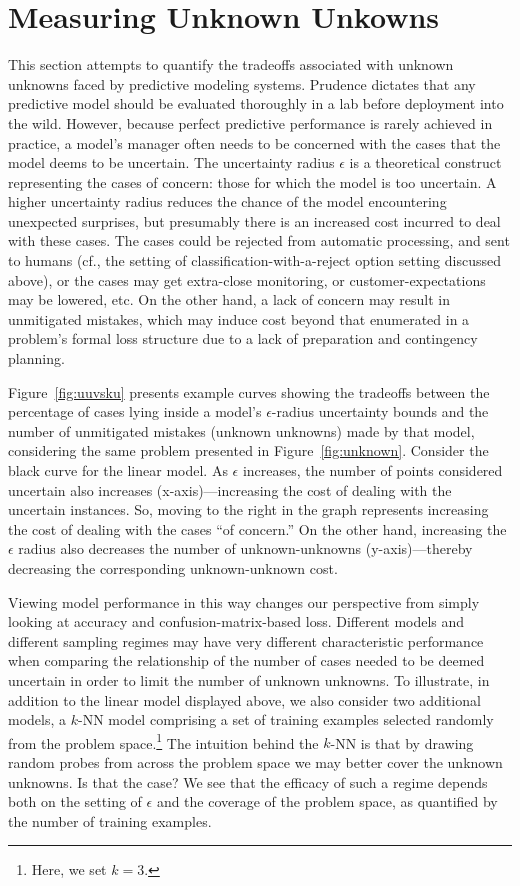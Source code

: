 \section{Measuring Unknown Unkowns}
\label{sec:measure}

This section attempts to quantify the tradeoffs associated with
unknown unknowns faced by predictive modeling systems.  Prudence dictates that any
predictive model should be evaluated thoroughly in a lab before
deployment into the wild. However, because perfect predictive
performance is rarely achieved in practice, a model's manager often
needs to be concerned with the cases that the model deems to be
uncertain.  The uncertainty radius $\epsilon$ is a theoretical
construct representing the cases of concern: those for which the model
is too uncertain.  A higher uncertainty radius reduces the chance of the model encountering unexpected surprises, but
 presumably there is an increased cost incurred to deal with these cases.
The cases could be rejected from automatic processing, and sent to
humans (cf., the setting of classification-with-a-reject option setting discussed above), or the
cases may get extra-close monitoring, or customer-expectations may be
lowered, etc.  On the other hand, a lack of concern may result in
unmitigated mistakes, which may induce cost beyond that enumerated in
a problem's formal loss structure due to a lack of preparation and contingency
planning.

Figure~\ref{fig:uuvsku} presents example curves showing the tradeoffs
between the percentage of cases lying inside a model's
$\epsilon$-radius uncertainty bounds and the number of unmitigated
mistakes (unknown unknowns) made by that model, considering the same
problem presented in Figure~\ref{fig:unknown}.  Consider the black
curve for the linear model.  As $\epsilon$ increases, the number of
points considered uncertain also increases (x-axis)---increasing the
cost of dealing with the uncertain instances.  So, moving to the right
in the graph represents increasing the cost of dealing with the cases
``of concern.''  On the other hand, increasing the $\epsilon$ radius
also decreases the number of unknown-unknowns (y-axis)---thereby
decreasing the corresponding unknown-unknown cost.

Viewing model performance in this way changes our perspective from
simply looking at accuracy and confusion-matrix-based loss.  Different
models and different sampling regimes may have very different
characteristic performance when comparing the relationship of the
number of cases needed to be deemed uncertain in order to limit the
number of unknown unknowns.
To illustrate, in addition to
the linear model displayed above, we also consider two additional
models, a $k$-NN model comprising a set of training examples selected randomly
from the problem space.\footnote{Here, we set $k=3$.} The intuition behind the $k$-NN is that by drawing
random probes from across the problem space we may better cover the unknown unknowns.  Is that the case?  We see that the efficacy of such a regime depends both on the setting of $\epsilon$ and the  coverage of the problem space, as quantified by the number of training examples. 

